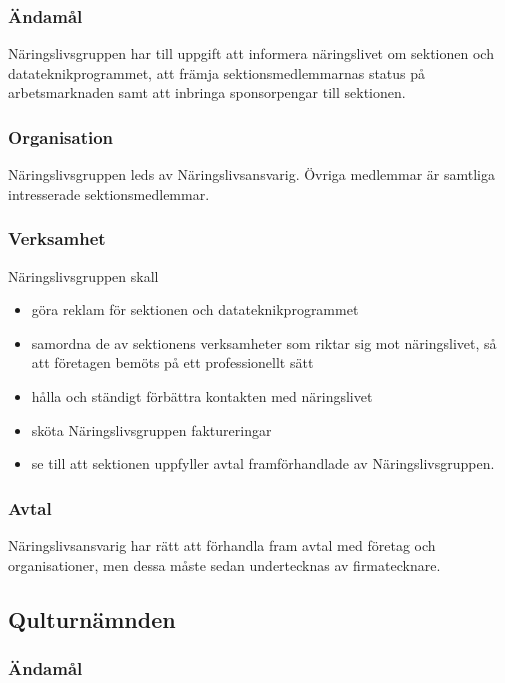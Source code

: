 \documentclass{dgovdoc}
\begin{document}
\subsubsection{Ändamål}

Näringslivsgruppen har till uppgift att informera näringslivet om sektionen och
datateknikprogrammet, att främja sektionsmedlemmarnas status på arbetsmarknaden
samt att inbringa sponsorpengar till sektionen.

\subsubsection{Organisation}

Näringslivsgruppen leds av Näringslivsansvarig. Övriga medlemmar är samtliga
intresserade sektionsmedlemmar.

\subsubsection{Verksamhet}

Näringslivsgruppen skall

\begin{itemize}
  \item göra reklam för sektionen och datateknikprogrammet
  \item samordna de av sektionens verksamheter som riktar sig mot näringslivet,
    så att företagen bemöts på ett professionellt sätt
  \item hålla och ständigt förbättra kontakten med näringslivet
  \item sköta Näringslivsgruppen faktureringar
  \item se till att sektionen uppfyller avtal framförhandlade av
    Näringslivsgruppen.
\end{itemize}

\subsubsection{Avtal}

Näringslivsansvarig har rätt att förhandla fram avtal med företag och
organisationer, men dessa måste sedan undertecknas av firmatecknare.

\subsection{Qulturnämnden}

\subsubsection{Ändamål}
\end{document}
